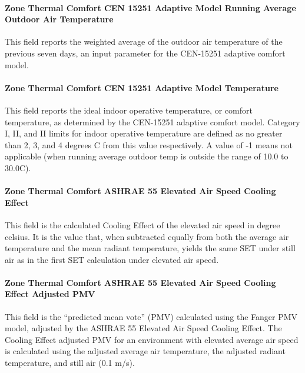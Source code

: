 \paragraph{Zone Thermal Comfort CEN 15251 Adaptive Model Running Average Outdoor Air Temperature}\label{zone-thermal-comfort-cen-15251-adaptive-model-running-average-outdoor-air-temperature}

This field reports the weighted average of the outdoor air temperature of the previous seven days, an input parameter for the CEN-15251 adaptive comfort model.

\paragraph{Zone Thermal Comfort CEN 15251 Adaptive Model Temperature}\label{zone-thermal-comfort-cen-15251-adaptive-model-temperature}

This field reports the ideal indoor operative temperature, or comfort temperature, as determined by the CEN-15251 adaptive comfort model. Category I, II, and II limits for indoor operative temperature are defined as no greater than 2, 3, and 4 degrees C from this value respectively. A value of -1 means not applicable (when running average outdoor temp is outside the range of 10.0 to 30.0C).

\paragraph{Zone Thermal Comfort ASHRAE 55 Elevated Air Speed Cooling Effect}\label{zone-thermal-comfort-ashrae55-elevated-air-speed-cooling-effect}

This field is the calculated Cooling Effect of the elevated air speed in degree celsius. It is the value that, when subtracted equally from both the average air temperature and the mean radiant temperature, yields the same SET under still air as in the first SET calculation under elevated air speed.

\paragraph{Zone Thermal Comfort ASHRAE 55 Elevated Air Speed Cooling Effect Adjusted PMV}\label{zone-thermal-comfort-ashrae55-elevated-air-speed-cooling-effect-adjusted-pmv}

This field is the ``predicted mean vote'' (PMV) calculated using the Fanger PMV model, adjusted by the ASHRAE 55 Elevated Air Speed Cooling Effect. The Cooling Effect adjusted PMV for an environment with elevated average air speed is calculated using the adjusted average air temperature, the adjusted radiant temperature, and still air (0.1 m/s). 

